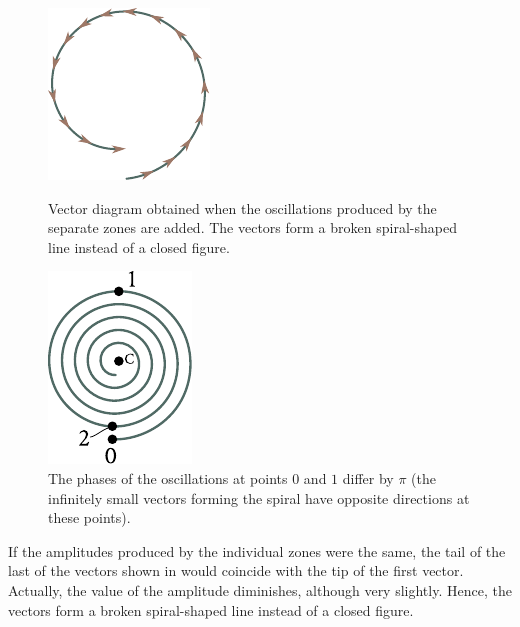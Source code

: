 \begin{figure}[!htb]
	\begin{minipage}[t]{0.48\linewidth}
		\begin{center}
			\includegraphics[scale=1]{figures/ch_18/fig_18_6.pdf}
            \caption[]{Vector diagram obtained when the oscillations produced by the separate zones are added. The vectors form a broken spiral-shaped line instead of a closed figure.}
			\label{fig:18_6}
		\end{center}
	\end{minipage}
	\hfill{ }%
	\begin{minipage}[t]{0.48\linewidth}
		\begin{center}
			\includegraphics[scale=1]{figures/ch_18/fig_18_7.pdf}
			\caption[]{The phases of the oscillations at points $0$ and $1$ differ by $\pi$ (the infinitely small vectors forming the spiral have opposite directions at these points).}
			\label{fig:18_7}
		\end{center}
	\end{minipage}
\vspace{-0.4cm}
\end{figure}

If the amplitudes produced by the individual zones were the same, the tail of the last of the vectors shown in  would coincide with the tip of the first vector.
Actually, the value of the amplitude diminishes, although very slightly.
Hence, the vectors form a broken spiral-shaped line instead of a closed figure.

